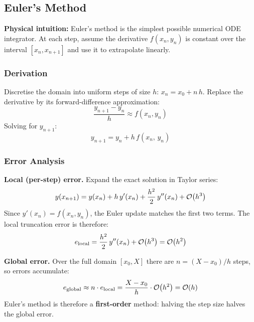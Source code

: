 \subsection{Euler's Method}

\noindent\textbf{Physical intuition:} Euler's method is the simplest possible
numerical ODE integrator. At each step, assume the derivative $f(x_n, y_n)$
is constant over the interval $[x_n, x_{n+1}]$ and use it to extrapolate
linearly.

\subsubsection{Derivation}
Discretise the domain into uniform steps of size $h$:
$x_n = x_0 + n\,h$. Replace the derivative by its forward-difference
approximation:
\begin{equation}
\frac{y_{n+1} - y_n}{h} \approx f(x_n, y_n)
\end{equation}
Solving for $y_{n+1}$:
\begin{equation}
\boxed{y_{n+1} = y_n + h\,f(x_n,\, y_n)}
\end{equation}

\subsubsection{Error Analysis}
\textbf{Local (per-step) error.} Expand the exact solution in Taylor series:
\begin{equation}
y(x_{n+1}) = y(x_n) + h\,y'(x_n) + \frac{h^2}{2}\,y''(x_n) + \mathcal{O}\!\left(h^3\right)
\end{equation}
Since $y'(x_n) = f(x_n, y_n)$, the Euler update matches the first two terms.
The local truncation error is therefore:
\begin{equation}
e_{\text{local}} = \frac{h^2}{2}\,y''(x_n) + \mathcal{O}\!\left(h^3\right) = \mathcal{O}\!\left(h^2\right)
\end{equation}

\textbf{Global error.} Over the full domain $[x_0, X]$ there are $n =
(X - x_0)/h$ steps, so errors accumulate:
\begin{equation}
e_{\text{global}} \approx n \cdot e_{\text{local}} = \frac{X - x_0}{h}
\cdot \mathcal{O}\!\left(h^2\right) = \mathcal{O}\!\left(h\right)
\end{equation}
Euler's method is therefore a \textbf{first-order} method: halving the step
size halves the global error.

